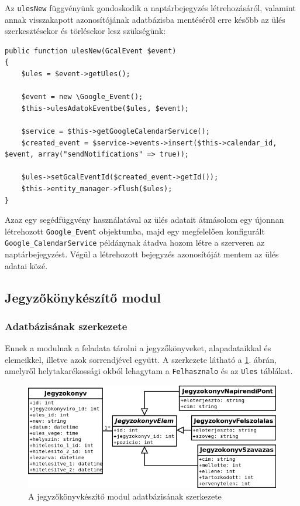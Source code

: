 \documentclass[a4paper,12pt,oneside]{report}
\begin{document}
Az {\tt ulesNew} függvényünk gondoskodik a naptárbejegyzés létrehozásáról, valamint annak visszakapott azonosítójának adatbázisba mentéséről \textendash{} erre később az ülés szerkesztésekor és törlésekor lesz szükségünk:

\begin{lstlisting}
public function ulesNew(GcalEvent $event)
{
    $ules = $event->getUles();

    $event = new \Google_Event();
    $this->ulesAdatokEventbe($ules, $event);

    $service = $this->getGoogleCalendarService();
    $created_event = $service->events->insert($this->calendar_id, $event, array("sendNotifications" => true));

    $ules->setGcalEventId($created_event->getId());
    $this->entity_manager->flush($ules);
}
\end{lstlisting}

Azaz egy segédfüggvény használatával az ülés adatait átmásolom egy újonnan létrehozott {\tt Google\_Event} objektumba, majd egy megfelelően konfigurált {\tt Google\_CalendarService} példánynak átadva hozom létre a szerveren az naptárbejegyzést. Végül a létrehozott bejegyzés azonosítóját mentem az ülés adatai közé.

\subsection{Jegyzőkönykészítő modul}

\subsubsection*{Adatbázisának szerkezete}

Ennek a modulnak a feladata tárolni a jegyzőkönyveket, alapadataikkal és elemeikkel, illetve azok sorrendjével együtt. A szerkezete látható a \ref{fig:jegyzokonyv_db}. ábrán, amelyről helytakarékossági okból lehagytam a {\tt Felhasznalo} és az {\tt Ules} táblákat.

\begin{figure}[h]
    \includegraphics[width=\textwidth]{jegyzokonyv_db.png}
    \caption{A jegyzőkönyvkészítő modul adatbázisának szerkezete}
    \label{fig:jegyzokonyv_db}
\end{figure}
\end{document}
